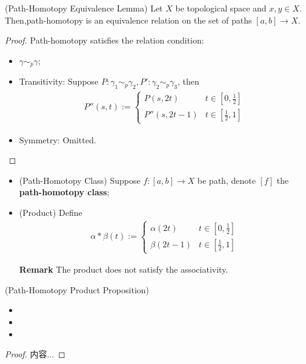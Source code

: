 \documentclass[Total.tex]{subfiles}
\begin{document}
	\begin{lemma}
		(Path-Homotopy Equivalence Lemma) Let $X$ be topological space and $x,y\in X$. Then,path-homotopy is an equivalence relation on the set of paths $[a,b]\rightarrow X$.
	\end{lemma}
	\begin{proof}
		Path-homotopy satisfies the relation condition:
		\begin{itemize}
			\item $\gamma\sim_{p} \gamma$;
			\item Transitivity: Suppose $P:\gamma_1\sim_p \gamma_2,P':\gamma_2\sim_p \gamma_3$, then
			\begin{gather*}
				P''(s,t):=\begin{cases}
					P(s,2t)&t\in [0,\frac{1}{2}]\\
					P''(s,2t-1)&t\in [\frac{1}{2},1]
				\end{cases}
			\end{gather*}
			\item Symmetry: Omitted.
		\end{itemize}
	\end{proof}
	
	\begin{Def}
		\begin{itemize}
			\item (Path-Homotopy Class) Suppose $f:[a,b]\rightarrow X$ be path, denote $[f]$ the \textbf{path-homotopy class};
			\item (Product) Define
			\begin{gather*}
				\alpha*\beta(t):=\begin{cases}
					\alpha(2t)&t\in [0,\frac{1}{2}]\\
					\beta(2t-1)&t\in [\frac{1}{2},1]
				\end{cases}
			\end{gather*}
			
			\textbf{Remark} The product does not satisfy the associativity.
		\end{itemize}
	\end{Def}
	\begin{proposition}
		(Path-Homotopy Product Proposition)
		
		\begin{itemize}
			\item 
			\item 
			\item 
		\end{itemize}
	\end{proposition}
	\begin{proof}
		内容...
	\end{proof}
\end{document}
